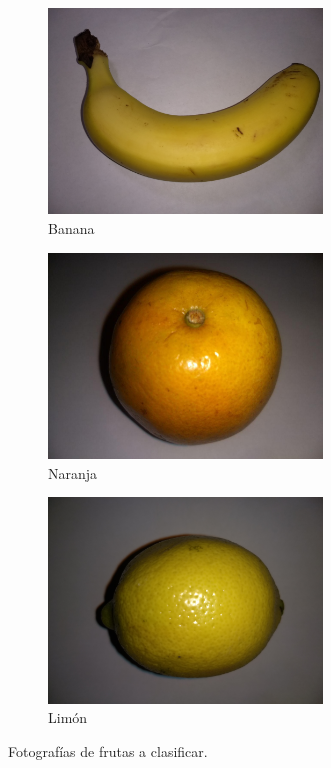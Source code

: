 \documentclass[10pt,a4paper]{article}
\begin{document}
\begin{figure}[h]
    \centering
    \begin{subfigure}[b]{0.3\textwidth}
        \includegraphics[width=0.8\textwidth]{imgs/test-banana.jpg}
        \caption{Banana}
        \label{banana}
    \end{subfigure}
    \begin{subfigure}[b]{0.3\textwidth}
        \includegraphics[width=0.8\textwidth]{imgs/test-orange.jpg}
        \caption{Naranja}
        \label{naranja}
    \end{subfigure}
    \begin{subfigure}[b]{0.3\textwidth}
        \includegraphics[width=0.8\textwidth]{imgs/test-lemon.jpg}
        \caption{Limón}
        \label{limon}
    \end{subfigure}
    \caption{Fotografías de frutas a clasificar.}\label{frutas}
\end{figure}
\end{document}
